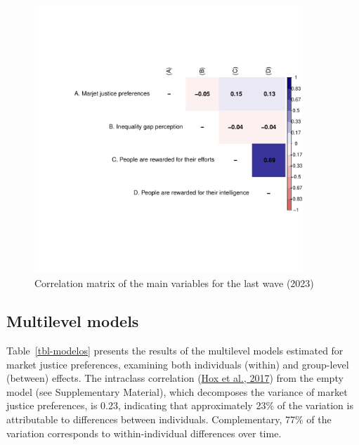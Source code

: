 \documentclass[
  12pt,
]{article}
\begin{document}
\begin{figure}[H]

{\centering \includegraphics[width=0.9\textwidth,height=\textheight]{paper_files/figure-pdf/fig-matrix-1.pdf}

}

\caption{\label{fig-matrix}Correlation matrix of the main variables for
the last wave (2023)}

\end{figure}

\hypertarget{multilevel-models}{%
\subsection{Multilevel models}\label{multilevel-models}}

Table~\ref{tbl-modelos} presents the results of the multilevel models
estimated for market justice preferences, examining both individuals
(within) and group-level (between) effects. The intraclass correlation
(\protect\hyperlink{ref-hoxMultilevelAnalysisTechniques2017a}{Hox et
al., 2017}) from the empty model (see Supplementary Material), which
decomposes the variance of market justice preferences, is 0.23,
indicating that approximately 23\% of the variation is attributable to
differences between individuals. Complementary, 77\% of the variation
corresponds to within-individual differences over time.
\end{document}
